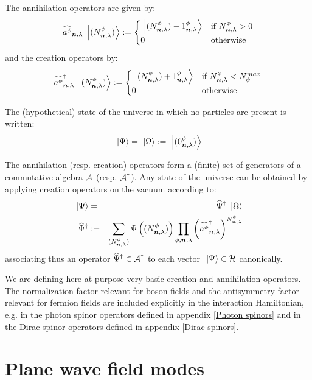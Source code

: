  The annihilation operators are given by:
\begin{equation*}
\widehat{a^{\phi}}_{{\boldsymbol{n}}, {\lambda}} \ \left|{({N}^{\phi}_{{\boldsymbol{n}}, {\lambda}})}\right\rangle := \begin{cases}
\ \left|{({N}^{\phi}_{{\boldsymbol{n}}, {\lambda}}) - {1}^{\phi}_{{\boldsymbol{n}}, {\lambda}}}\right\rangle & \text{if ${N}^{\phi}_{{\boldsymbol{n}}, {\lambda}} > 0$} \\
0 & \text{otherwise}
\end{cases}
\end{equation*}
and the creation operators by:
\begin{equation*}
\widehat{a^{\phi}}^{\dagger}_{{\boldsymbol{n}}, {\lambda}} \ \left|{({N}^{\phi}_{{\boldsymbol{n}}, {\lambda}})}\right\rangle := \begin{cases}
\ \left|{({N}^{\phi}_{{\boldsymbol{n}}, {\lambda}}) + {1}^{\phi}_{{\boldsymbol{n}}, {\lambda}}}\right\rangle & \text{if ${N}^{\phi}_{{\boldsymbol{n}}, {\lambda}} < N_{\phi}^{max}$} \\
0 & \text{otherwise}
\end{cases}
\end{equation*}

The (hypothetical) state of the universe in which no particles are present is written:
\begin{equation*}
\ \left|{\Psi}\right\rangle = \ \left|{\Omega}\right\rangle := \ \left|{({0}^{\phi}_{{\boldsymbol{n}}, {\lambda}})}\right\rangle
\end{equation*}

 The annihilation (resp. creation) operators form a (finite) set of generators of a commutative algebra $\mathcal A$ (resp. $\mathcal A^{\dagger}$). Any state of the universe can be obtained by applying creation operators on the vacuum according to:
\begin{eqnarray*}
\ \left|{\Psi}\right\rangle & = & \widehat{\Psi}^{\dagger} \ \left|{\Omega}\right\rangle \\
\widehat{\Psi}^{\dagger} & := & \sum_{({N}^{\phi}_{{\boldsymbol{n}}, {\lambda}})} \Psi \left(({N}^{\phi}_{{\boldsymbol{n}}, {\lambda}}) \right) \prod_{\phi,\boldsymbol{n},\lambda} \left( \widehat{a^{\phi}}^{\dagger}_{{\boldsymbol{n}}, {\lambda}} \right)^{{N}^{\phi}_{{\boldsymbol{n}}, {\lambda}}}
\end{eqnarray*}
associating thus an operator $\widehat{\Psi}^{\dagger} \in \mathcal A^{\dagger}$ to each vector $\ \left|{\Psi}\right\rangle \in \mathcal H$ canonically.

 We are defining here at purpose very basic creation and annihilation operators. The normalization factor relevant for boson fields and the antisymmetry factor relevant for fermion fields are included explicitly in the interaction Hamiltonian, e.g. in the photon spinor operators defined in appendix \ref{Photon spinors} and in the Dirac spinor operators defined in appendix \ref{Dirac spinors}.

\section{Plane wave field modes}

